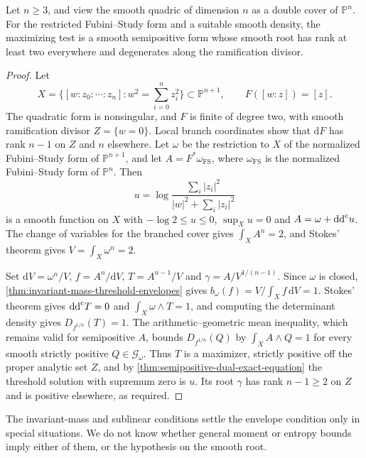 \begin{example}\label{ex:quadric-rank-two-dual-attainment}
Let $n\geq3$, and view the smooth quadric of dimension $n$ as a double cover of $\mathbb P^n$. For the restricted Fubini--Study form and a suitable smooth density, the maximizing test is a smooth semipositive form whose smooth root has rank at least two everywhere and degenerates along the ramification divisor.
\end{example}
\begin{proof}
Let
\[
 X=\{[w:z_0:\cdots:z_n]:w^2=\textstyle\sum_{i=0}^nz_i^2\}
       \subset\mathbb P^{n+1},\qquad F([w:z])=[z].
\]
The quadratic form is nonsingular, and $F$ is finite of degree two, with smooth ramification divisor $Z=\{w=0\}$. Local branch coordinates show that $\mathrm dF$ has rank $n-1$ on $Z$ and $n$ elsewhere. Let $\omega$ be the restriction to $X$ of the normalized Fubini--Study form of $\mathbb P^{n+1}$, and let $A=F^*\omega_{\mathrm{FS}}$, where $\omega_{\mathrm{FS}}$ is the normalized Fubini--Study form of $\mathbb P^n$. Then
\[
 u=\log\frac{\sum_i|z_i|^2}{|w|^2+\sum_i|z_i|^2}
\]
is a smooth function on $X$ with $-\log2\leq u\leq0$, $\sup_Xu=0$ and $A=\omega+\mathrm{dd}^{\mathrm{c}} u$. The change of variables for the branched cover gives $\int_XA^n=2$, and Stokes' theorem gives $V=\int_X\omega^n=2$.

Set $\mathrm{d}V=\omega^n/V$, $f=A^n/\mathrm{d}V$, $T=A^{n-1}/V$ and $\gamma=A/V^{1/(n-1)}$. Since $\omega$ is closed, \cref{thm:invariant-mass-threshold-envelopes} gives $b_\omega(f)=V/\int_Xf\,\mathrm{d}V=1$. Stokes' theorem gives $\mathrm{dd}^{\mathrm{c}} T=0$ and $\int_X\omega\wedge T=1$, and computing the determinant density gives $D_{f^{1/n}}(T)=1$. The arithmetic--geometric mean inequality, which remains valid for semipositive $A$, bounds $D_{f^{1/n}}(Q)$ by $\int_XA\wedge Q=1$ for every smooth strictly positive $Q\in\mathscr G_\omega$. Thus $T$ is a maximizer, strictly positive off the proper analytic set $Z$, and by \cref{thm:semipositive-dual-exact-equation} the threshold solution with supremum zero is $u$. Its root $\gamma$ has rank $n-1\geq2$ on $Z$ and is positive elsewhere, as required.
\end{proof}

The invariant-mass and sublinear conditions settle the envelope condition only in special situations. We do not know whether general moment or entropy bounds imply either of them, or the hypothesis on the smooth root.
